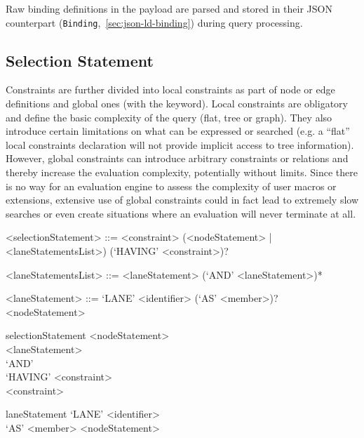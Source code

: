 \documentclass[11pt,a4paper]{report}
\newcommand{\iqlType}[1]{\texttt{\iqlns#1}}
\begin{document}
\noindent Raw binding definitions in the payload are parsed and stored in their JSON counterpart (\iqlType{Binding},~\ref{sec:json-ld-binding}) during query processing.

\subsection{Selection Statement}
\label{sec:selection}

Constraints are further divided into local constraints as part of node or edge definitions and global ones (with the  keyword). 
Local constraints are obligatory and define the basic complexity of the query (flat, tree or graph). 
They also introduce certain limitations on what can be expressed or searched (e.g. a ``flat'' local constraints declaration will not provide implicit access to tree information). 
However, global constraints can introduce arbitrary constraints or relations and thereby increase the evaluation complexity, potentially without limits. 
Since there is no way for an evaluation engine to assess the complexity of user macros or extensions, extensive use of global constraints could in fact lead to extremely slow searches or even create situations where an evaluation will never terminate at all.

\begin{gram}
	\label{gram:selection}
	\begin{grammar}	
		<selectionStatement> ::= <constraint>
		\alt (<nodeStatement> | <laneStatementsList>) (`HAVING' <constraint>)?	
		
		<laneStatementsList> ::= <laneStatement> (`AND' <laneStatement>)*
		
		<laneStatement> ::= `LANE' <identifier> (`AS' <member>)? <nodeStatement>
	\end{grammar}
	\diagsep
	
	\begin{rrdiag*}{selectionStatement}
		\sst
			\sst <nodeStatement> \\ \srp <laneStatement> \\ `AND' \erp \est
				\sst \\ `HAVING' <constraint> \est \\ 
			<constraint> 
		\est
	\end{rrdiag*}

	\begin{rrdiag*}{laneStatement}
		`LANE' <identifier> \sst \\ `AS' <member> \est <nodeStatement>
	\end{rrdiag*}
\end{gram}
\end{document}
